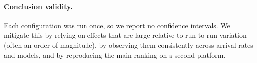 \paragraph{Conclusion validity.}
Each configuration was run once, so we report no confidence intervals. We mitigate this by
relying on effects that are large relative to run-to-run variation (often an order of magnitude),
by observing them consistently across arrival rates and models, and by reproducing the main
ranking on a second platform. 

